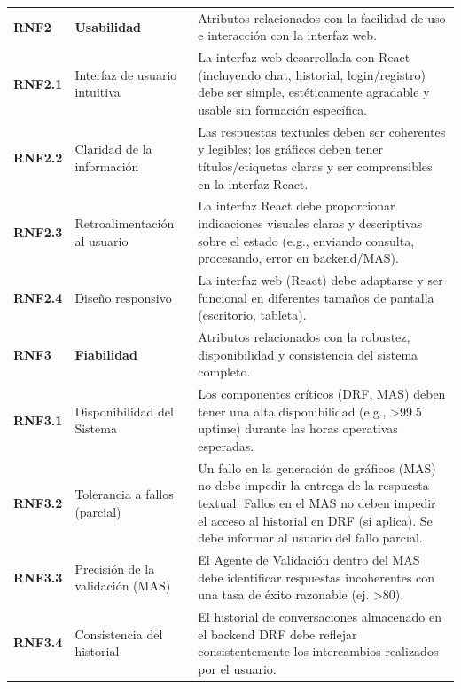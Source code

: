 \begin{longtable}{@{}l >{\raggedright\arraybackslash}p{5cm} >{\raggedright\arraybackslash}p{8cm}@{}}
	\textbf{RNF2} & \textbf{Usabilidad} & Atributos relacionados con la facilidad de uso e interacción con la interfaz web. \\
	\textbf{RNF2.1} & Interfaz de usuario intuitiva & La interfaz web desarrollada con React (incluyendo chat, historial, login/registro) debe ser simple, estéticamente agradable y usable sin formación específica. \\
	\textbf{RNF2.2} & Claridad de la información & Las respuestas textuales deben ser coherentes y legibles; los gráficos deben tener títulos/etiquetas claras y ser comprensibles en la interfaz React. \\
	\textbf{RNF2.3} & Retroalimentación al usuario & La interfaz React debe proporcionar indicaciones visuales claras y descriptivas sobre el estado (e.g., enviando consulta, procesando, error en backend/MAS). \\
	\textbf{RNF2.4} & Diseño responsivo & La interfaz web (React) debe adaptarse y ser funcional en diferentes tamaños de pantalla (escritorio, tableta). \\
	\midrule
	
	\textbf{RNF3} & \textbf{Fiabilidad} & Atributos relacionados con la robustez, disponibilidad y consistencia del sistema completo. \\
	\textbf{RNF3.1} & Disponibilidad del Sistema & Los componentes críticos (DRF, MAS) deben tener una alta disponibilidad (e.g., >99.5 uptime) durante las horas operativas esperadas. \\
	\textbf{RNF3.2} & Tolerancia a fallos (parcial) & Un fallo en la generación de gráficos (MAS) no debe impedir la entrega de la respuesta textual. Fallos en el MAS no deben impedir el acceso al historial en DRF (si aplica). Se debe informar al usuario del fallo parcial. \\
	\textbf{RNF3.3} & Precisión de la validación (MAS) & El Agente de Validación dentro del MAS debe identificar respuestas incoherentes con una tasa de éxito razonable (ej. >80). \\
	\textbf{RNF3.4} & Consistencia del historial & El historial de conversaciones almacenado en el backend DRF debe reflejar consistentemente los intercambios realizados por el usuario. \\
	\midrule
	

\end{longtable}
